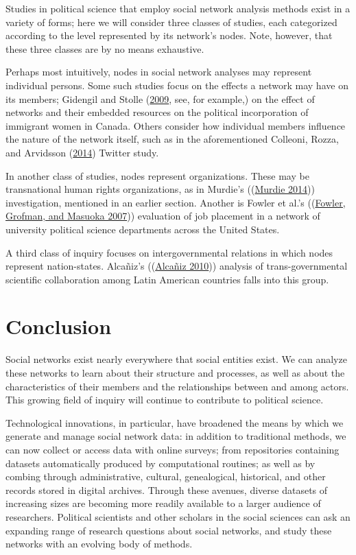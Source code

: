 \documentclass{book}
\begin{document}
Studies in political science that employ social network analysis methods exist
in a variety of forms; here we will consider three classes of studies, each
categorized according to the level represented by its network's nodes. Note,
however, that these three classes are by no means exhaustive.

Perhaps most intuitively, nodes in social network analyses may represent
individual persons. Some such studies focus on the effects a network may have
on its members; Gidengil and Stolle
(\protect\hyperlink{ref-GidengilStolle2009}{2009}, see, for example,) on the
effect of networks and their embedded resources on the political incorporation
of immigrant women in Canada. Others consider how individual members influence
the nature of the network itself, such as in the aforementioned Colleoni,
Rozza, and Arvidsson (\protect\hyperlink{ref-ColleoniEtAl2014}{2014}) Twitter
study.

In another class of studies, nodes represent organizations. These may be
transnational human rights organizations, as in Murdie's
((\protect\hyperlink{ref-Murdie2014}{Murdie 2014})) investigation, mentioned
in an earlier section. Another is Fowler et al.'s
((\protect\hyperlink{ref-FowlerEtAl2007}{Fowler, Grofman, and Masuoka 2007}))
evaluation of job placement in a network of university political science
departments across the United States.

A third class of inquiry focuses on intergovernmental relations in which nodes
represent nation-states. Alcañiz's
((\protect\hyperlink{ref-Alcaniz2010}{Alcañiz 2010})) analysis of
trans-governmental scientific collaboration among Latin American countries
falls into this group.

\hypertarget{conclusion-7}{%
\section{Conclusion}\label{conclusion-7}}

Social networks exist nearly everywhere that social entities exist. We can
analyze these networks to learn about their structure and processes, as well
as about the characteristics of their members and the relationships between
and among actors. This growing field of inquiry will continue to contribute to
political science.

Technological innovations, in particular, have broadened the means by which we
generate and manage social network data: in addition to traditional methods,
we can now collect or access data with online surveys; from repositories
containing datasets automatically produced by computational routines; as well
as by combing through administrative, cultural, genealogical, historical, and
other records stored in digital archives. Through these avenues, diverse
datasets of increasing sizes are becoming more readily available to a larger
audience of researchers. Political scientists and other scholars in the social
sciences can ask an expanding range of research questions about social
networks, and study these networks with an evolving body of methods.
\end{document}
